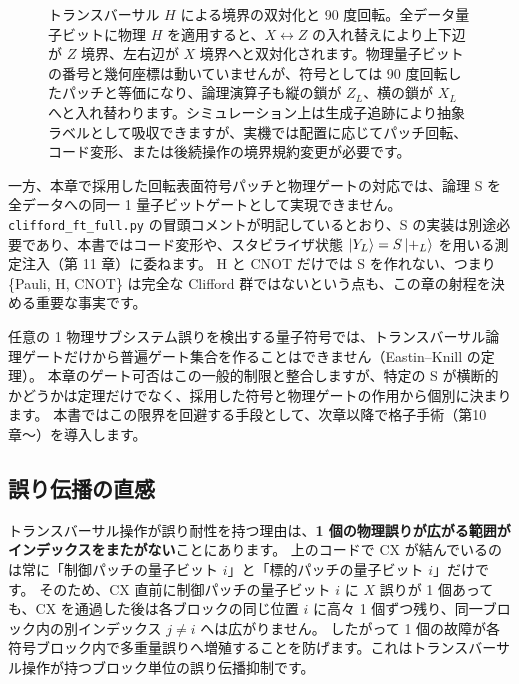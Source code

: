 \begin{figure}[htbp]
{%
  }
  \caption{トランスバーサル $H$ による境界の双対化と 90 度回転。全データ量子ビットに物理 $H$ を適用すると、$X \leftrightarrow Z$ の入れ替えにより上下辺が $Z$ 境界、左右辺が $X$ 境界へと双対化されます。物理量子ビットの番号と幾何座標は動いていませんが、符号としては 90 度回転したパッチと等価になり、論理演算子も縦の鎖が $Z_L$、横の鎖が $X_L$ へと入れ替わります。シミュレーション上は生成子追跡により抽象ラベルとして吸収できますが、実機では配置に応じてパッチ回転、コード変形、または後続操作の境界規約変更が必要です。}
  \label{fig:ch9_transversal_h_rotation}
\end{figure}

一方、本章で採用した回転表面符号パッチと物理ゲートの対応では、論理 S を全データへの同一 1 量子ビットゲートとして実現できません。
\texttt{clifford\_ft\_full.py} の冒頭コメントが明記しているとおり、S の実装は別途必要であり、本書ではコード変形や、スタビライザ状態 $\ket{Y_L}=S\ket{+_L}$ を用いる測定注入（第 11 章）に委ねます。
H と CNOT だけでは S を作れない、つまり \{Pauli, H, CNOT\} は完全な Clifford 群ではないという点も、この章の射程を決める重要な事実です。

\begin{notebox}
  任意の 1 物理サブシステム誤りを検出する量子符号では、トランスバーサル論理ゲートだけから普遍ゲート集合を作ることはできません（Eastin--Knill の定理）\cite{eastin2009transversal}。
  本章のゲート可否はこの一般的制限と整合しますが、特定の S が横断的かどうかは定理だけでなく、採用した符号と物理ゲートの作用から個別に決まります。
  本書ではこの限界を回避する手段として、次章以降で格子手術（第10章〜）を導入します。
\end{notebox}

\subsection{誤り伝播の直感}\label{subsec:propagation}

トランスバーサル操作が誤り耐性を持つ理由は、\textbf{1 個の物理誤りが広がる範囲がインデックスをまたがない}ことにあります。
上のコードで CX が結んでいるのは常に「制御パッチの量子ビット $i$」と「標的パッチの量子ビット $i$」だけです。
そのため、CX 直前に制御パッチの量子ビット $i$ に $X$ 誤りが 1 個あっても、CX を通過した後は各ブロックの同じ位置 $i$ に高々 1 個ずつ残り、同一ブロック内の別インデックス $j\neq i$ へは広がりません。
したがって 1 個の故障が各符号ブロック内で多重量誤りへ増殖することを防げます。これはトランスバーサル操作が持つブロック単位の誤り伝播抑制です\cite{eastin2009transversal}。

